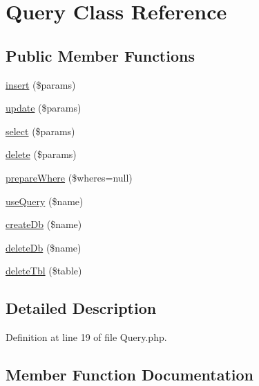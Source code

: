 \hypertarget{class_zest_1_1_database_1_1_query_1_1_query}{}\section{Query Class Reference}
\label{class_zest_1_1_database_1_1_query_1_1_query}
\subsection*{Public Member Functions}
\begin{DoxyCompactItemize}
\item 
\mbox{\hyperlink{class_zest_1_1_database_1_1_query_1_1_query_a67366620fdfeaab4b480b6e4dca64deb}{insert}} (\$params)
\item 
\mbox{\hyperlink{class_zest_1_1_database_1_1_query_1_1_query_aacfc8ca52b10f139be3398f374cd01cb}{update}} (\$params)
\item 
\mbox{\hyperlink{class_zest_1_1_database_1_1_query_1_1_query_aaade19290861bb3abf902bb14a51889b}{select}} (\$params)
\item 
\mbox{\hyperlink{class_zest_1_1_database_1_1_query_1_1_query_a2fb5b35138aabdbcdbabde07ff1df4b6}{delete}} (\$params)
\item 
\mbox{\hyperlink{class_zest_1_1_database_1_1_query_1_1_query_afdf795c4c3d555cc515a24249a80919b}{prepare\+Where}} (\$wheres=null)
\item 
\mbox{\hyperlink{class_zest_1_1_database_1_1_query_1_1_query_ae44347ec6a2b1e9a12e081db309d0734}{use\+Query}} (\$name)
\item 
\mbox{\hyperlink{class_zest_1_1_database_1_1_query_1_1_query_a3653b70be0271cad4b87a49bdcd18ccf}{create\+Db}} (\$name)
\item 
\mbox{\hyperlink{class_zest_1_1_database_1_1_query_1_1_query_ae35a90b0a5f1b3d17dfbe5323b6d6983}{delete\+Db}} (\$name)
\item 
\mbox{\hyperlink{class_zest_1_1_database_1_1_query_1_1_query_a865173a2c9500d4ba41ce697bd71209a}{delete\+Tbl}} (\$table)
\end{DoxyCompactItemize}


\subsection{Detailed Description}


Definition at line 19 of file Query.\+php.



\subsection{Member Function Documentation}
\mbox{\label{class_zest_1_1_database_1_1_query_1_1_query_a3653b70be0271cad4b87a49bdcd18ccf}} 

